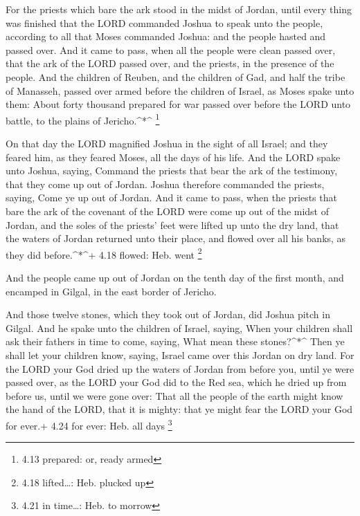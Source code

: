  For the priests which bare the ark stood in the midst of
Jordan, until every thing was finished that the LORD commanded Joshua to
speak unto the people, according to all that Moses commanded Joshua: and
the people hasted and passed over.  And it came to pass,
when all the people were clean passed over, that the ark of the LORD
passed over, and the priests, in the presence of the people.
 And the children of Reuben, and the children of Gad, and
half the tribe of Manasseh, passed over armed before the children of
Israel, as Moses spake unto them:  About forty thousand
prepared for war passed over before the LORD unto battle, to the plains
of Jericho.\^{}*\^{} \footnote{4.13 prepared: or, ready armed}

 On that day the LORD magnified Joshua in the sight of all
Israel; and they feared him, as they feared Moses, all the days of his
life.  And the LORD spake unto Joshua, saying,
 Command the priests that bear the ark of the testimony,
that they come up out of Jordan.  Joshua therefore
commanded the priests, saying, Come ye up out of Jordan. 
And it came to pass, when the priests that bare the ark of the covenant
of the LORD were come up out of the midst of Jordan, and the soles of
the priests' feet were lifted up unto the dry land, that the waters of
Jordan returned unto their place, and flowed over all his banks, as they
did before.\^{}*\^{}+ 4.18 flowed: Heb. went \footnote{4.18
  lifted\ldots: Heb. plucked up}

 And the people came up out of Jordan on the tenth day of
the first month, and encamped in Gilgal, in the east border of Jericho.

 And those twelve stones, which they took out of Jordan,
did Joshua pitch in Gilgal.  And he spake unto the children
of Israel, saying, When your children shall ask their fathers in time to
come, saying, What mean these stones?\^{}*\^{}  Then ye
shall let your children know, saying, Israel came over this Jordan on
dry land.  For the LORD your God dried up the waters of
Jordan from before you, until ye were passed over, as the LORD your God
did to the Red sea, which he dried up from before us, until we were gone
over:  That all the people of the earth might know the hand
of the LORD, that it is mighty: that ye might fear the LORD your God for
ever.+ 4.24 for ever: Heb. all days \footnote{4.21 in time\ldots: Heb.
  to morrow}

